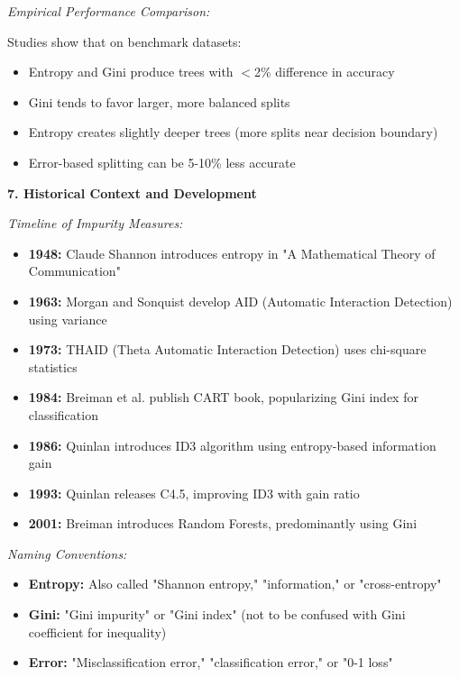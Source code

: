 \documentclass[12pt]{article}
\begin{document}
\begin{explanation}
\textit{Empirical Performance Comparison:}

Studies show that on benchmark datasets:
\begin{itemize}
    \item Entropy and Gini produce trees with $<$2\% difference in accuracy
    \item Gini tends to favor larger, more balanced splits
    \item Entropy creates slightly deeper trees (more splits near decision boundary)
    \item Error-based splitting can be 5-10\% less accurate
\end{itemize}

\textbf{7. Historical Context and Development}

\textit{Timeline of Impurity Measures:}

\begin{itemize}
    \item \textbf{1948:} Claude Shannon introduces entropy in "A Mathematical Theory of Communication"
    \item \textbf{1963:} Morgan and Sonquist develop AID (Automatic Interaction Detection) using variance
    \item \textbf{1973:} THAID (Theta Automatic Interaction Detection) uses chi-square statistics
    \item \textbf{1984:} Breiman et al. publish CART book, popularizing Gini index for classification
    \item \textbf{1986:} Quinlan introduces ID3 algorithm using entropy-based information gain
    \item \textbf{1993:} Quinlan releases C4.5, improving ID3 with gain ratio
    \item \textbf{2001:} Breiman introduces Random Forests, predominantly using Gini
\end{itemize}

\textit{Naming Conventions:}

\begin{itemize}
    \item \textbf{Entropy:} Also called "Shannon entropy," "information," or "cross-entropy"
    \item \textbf{Gini:} "Gini impurity" or "Gini index" (not to be confused with Gini coefficient for inequality)
    \item \textbf{Error:} "Misclassification error," "classification error," or "0-1 loss"
\end{itemize}


\end{explanation}
\end{document}
